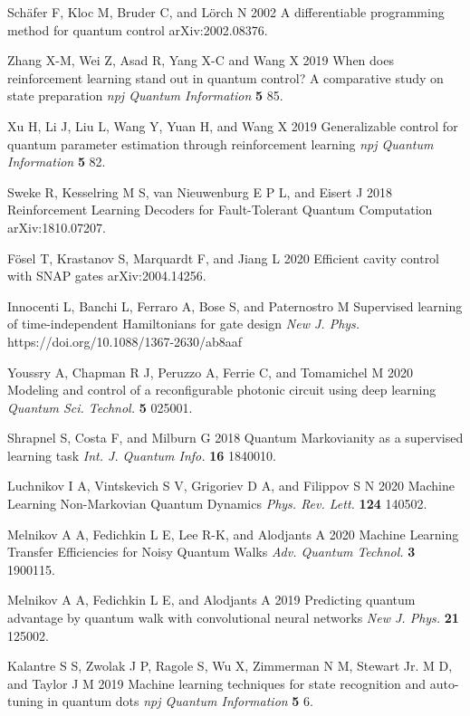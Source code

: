 \documentclass[12pt]{iopart}
\begin{document}
\begin{thebibliography}{999}
 Sch\"afer F, Kloc M, Bruder C, and L\"orch N 2002 A differentiable programming method for quantum control arXiv:2002.08376.

 Zhang X-M, Wei Z, Asad R, Yang X-C and Wang X 2019 When does reinforcement learning stand out in quantum control? A comparative study on state preparation
{\it npj Quantum Information} {\bf 5} 85.

 Xu H, Li J, Liu L, Wang Y, Yuan H, and Wang X 2019 Generalizable control for quantum parameter estimation through reinforcement learning {\it npj Quantum Information} {\bf 5} 82.

 Sweke R, Kesselring M S, van Nieuwenburg E P L, and Eisert J 2018 Reinforcement Learning Decoders for Fault-Tolerant Quantum Computation arXiv:1810.07207.

 F\"osel T, Krastanov S, Marquardt F, and Jiang L 2020 Efficient cavity control with SNAP gates  arXiv:2004.14256.

 Innocenti L, Banchi L, Ferraro A, Bose S, and Paternostro M Supervised learning of time-independent Hamiltonians for gate design {\it New J. Phys.} https://doi.org/10.1088/1367-2630/ab8aaf

 Youssry A, Chapman R J, Peruzzo A, Ferrie C, and Tomamichel M 2020 Modeling and control of a reconfigurable photonic circuit using deep learning {\it Quantum Sci. Technol.} {\bf 5} 025001.

 Shrapnel S, Costa F, and Milburn G 2018 Quantum Markovianity as a supervised learning task {\it Int. J. Quantum Info.} {\bf 16} 1840010. 

 Luchnikov I A, Vintskevich S V, Grigoriev D A, and Filippov S N 2020 Machine Learning Non-Markovian Quantum Dynamics {\it Phys. Rev. Lett.} {\bf 124} 140502.

 Melnikov A A, Fedichkin L E, Lee R-K, and Alodjants A 2020 Machine Learning Transfer Efficiencies for Noisy Quantum Walks {\it Adv. Quantum Technol.} {\bf 3} 1900115.

 Melnikov A A, Fedichkin L E, and Alodjants A 2019 Predicting quantum advantage by quantum walk with convolutional neural networks {\it New J. Phys.} {\bf 21} 125002.

 Kalantre S S, Zwolak J P, Ragole S, Wu X, Zimmerman N M, Stewart Jr. M D, and Taylor J M 2019 Machine learning techniques for state recognition and auto-tuning in quantum dots {\it npj Quantum Information} {\bf 5} 6. 


\end{thebibliography}
\end{document}
